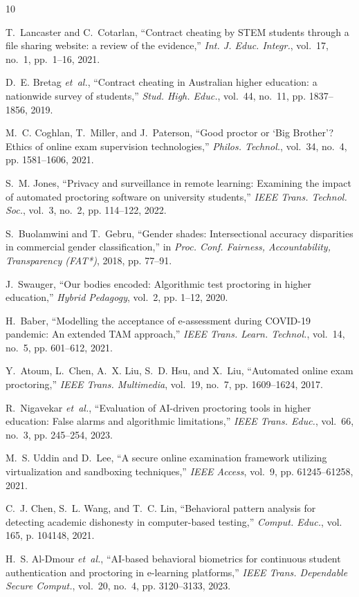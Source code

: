 \documentclass[journal]{IEEEtran}
\begin{document}

\begin{thebibliography}{10}

T.~Lancaster and C.~Cotarlan, ``Contract cheating by STEM students through a file sharing website: a review of the evidence,'' \emph{Int. J. Educ. Integr.}, vol.~17, no.~1, pp.~1--16, 2021.

D.~E. Bretag \emph{et~al.}, ``Contract cheating in Australian higher education: a nationwide survey of students,'' \emph{Stud. High. Educ.}, vol.~44, no.~11, pp. 1837--1856, 2019.

M.~C. Coghlan, T.~Miller, and J.~Paterson, ``Good proctor or `Big Brother'? Ethics of online exam supervision technologies,'' \emph{Philos. Technol.}, vol.~34, no.~4, pp. 1581--1606, 2021.

S.~M. Jones, ``Privacy and surveillance in remote learning: Examining the impact of automated proctoring software on university students,'' \emph{IEEE Trans. Technol. Soc.}, vol.~3, no.~2, pp. 114--122, 2022.

S.~Buolamwini and T.~Gebru, ``Gender shades: Intersectional accuracy disparities in commercial gender classification,'' in \emph{Proc. Conf. Fairness, Accountability, Transparency (FAT*)}, 2018, pp. 77--91.

J.~Swauger, ``Our bodies encoded: Algorithmic test proctoring in higher education,'' \emph{Hybrid Pedagogy}, vol.~2, pp. 1--12, 2020.

H.~Baber, ``Modelling the acceptance of e-assessment during COVID-19 pandemic: An extended TAM approach,'' \emph{IEEE Trans. Learn. Technol.}, vol.~14, no.~5, pp. 601--612, 2021.

Y.~Atoum, L.~Chen, A.~X. Liu, S.~D. Hsu, and X.~Liu, ``Automated online exam proctoring,'' \emph{IEEE Trans. Multimedia}, vol.~19, no.~7, pp. 1609--1624, 2017.

R.~Nigavekar \emph{et~al.}, ``Evaluation of AI-driven proctoring tools in higher education: False alarms and algorithmic limitations,'' \emph{IEEE Trans. Educ.}, vol.~66, no.~3, pp. 245--254, 2023.

M.~S. Uddin and D.~Lee, ``A secure online examination framework utilizing virtualization and sandboxing techniques,'' \emph{IEEE Access}, vol.~9, pp. 61245--61258, 2021.

C.~J. Chen, S.~L. Wang, and T.~C. Lin, ``Behavioral pattern analysis for detecting academic dishonesty in computer-based testing,'' \emph{Comput. Educ.}, vol. 165, p. 104148, 2021.

H.~S. Al-Dmour \emph{et~al.}, ``AI-based behavioral biometrics for continuous student authentication and proctoring in e-learning platforms,'' \emph{IEEE Trans. Dependable Secure Comput.}, vol.~20, no.~4, pp. 3120--3133, 2023.

\end{thebibliography}
\end{document}
